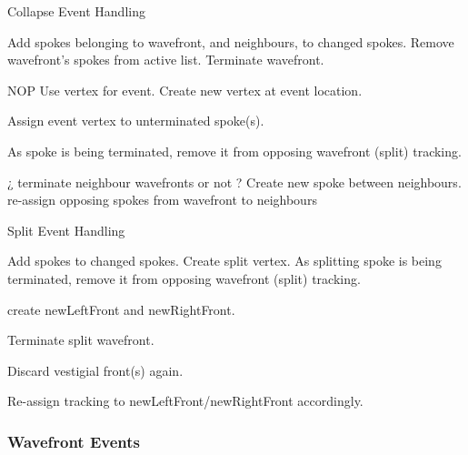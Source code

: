 \documentclass[12pt,a4paper,oneside,openany]{article}
\begin{document}
\begin{algorithm}
\caption{Collapse Event Handling}
\label{alg:fpce}
\begin{algorithmic}

	\State Add spokes belonging to wavefront, and neighbours, to changed spokes.
	\State Remove wavefront's spokes from active list.
	\State Terminate wavefront.

		\State NOP
	\Else
			\State Use vertex for event.
		\Else
			\State Create new vertex at event location.
		\EndIf
		
		\State Assign event vertex to unterminated spoke(s).
		
			\State As spoke is being terminated, remove it from opposing wavefront (split) tracking.
		\EndIf
		
			\State ¿ terminate neighbour wavefronts or not ?
		\Else
			\State Create new spoke between neighbours.
			\State re-assign opposing spokes from wavefront to neighbours
		\EndIf
	\EndIf 
	
\end{algorithmic}
\end{algorithm}

\begin{algorithm}
\caption{Split Event Handling}
\label{alg:fpse}
\begin{algorithmic}

	\State Add spokes to changed spokes.
	\State Create split vertex.
	\State As splitting spoke is being terminated, remove it from opposing wavefront (split) tracking.
	
	\State create newLeftFront and newRightFront.


	\State Terminate split wavefront.
	
	
		\State Discard vestigial front(s) again.
	\EndIf
	
		\State Re-assign tracking to newLeftFront/newRightFront accordingly.
	\EndFor

	
\end{algorithmic}
\end{algorithm}


\subsubsection{Wavefront Events}
\end{document}
